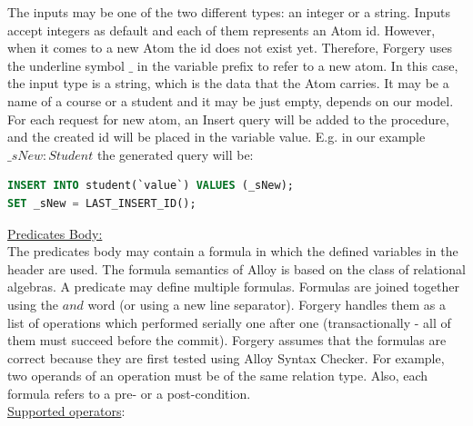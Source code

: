 \documentclass[oneside]{book}
\begin{document}
\noindent The inputs may be one of the two different types: an integer or a string. Inputs accept integers as default and each of them represents an Atom id. However, when it comes to a new Atom the id does not exist yet. Therefore, Forgery uses the underline symbol $\_$ in the variable prefix to refer to a new atom. In this case, the input type is a string, which is the data that the Atom carries. It may be a name of a course or a student and it may be just empty, depends on our model.\\

For each request for new atom, an Insert query will be added to the procedure, and the created id will be placed in the variable value. E.g. in our example $\_sNew : Student$ the generated query will be:
\begin{lstlisting}[escapechar=@,language=SQL]
INSERT INTO student(`value`) VALUES (_sNew);
SET _sNew = LAST_INSERT_ID();
\end{lstlisting}

\noindent\underline{Predicates Body:}\\

\noindent The predicates body may contain a formula in which the defined variables in the header are used. 
The formula semantics of Alloy is based on the class of relational algebras. A predicate may define multiple formulas. Formulas are joined together using the $and$ word (or using a new line separator). Forgery handles them as a list of operations which performed serially one after one (transactionally - all of them must succeed before the commit). Forgery assumes that the formulas are correct because they are first tested using Alloy Syntax Checker. For example, two operands of an operation must be of the same relation type. Also, each formula refers to a pre- or a post-condition.\\

\noindent\underline{Supported operators}:
\end{document}
